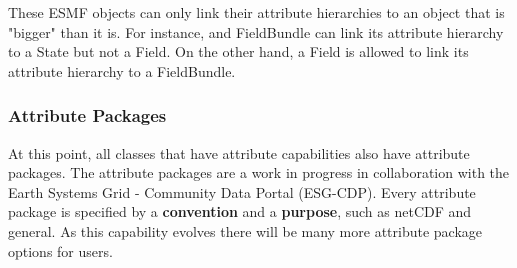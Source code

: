 These ESMF objects can only link their attribute hierarchies to an object that is "bigger" than it is.  For instance, and FieldBundle can link its attribute hierarchy to a State but not a Field.  On the other hand, a Field is allowed to link its attribute hierarchy to a FieldBundle.  

\subsubsection{Attribute Packages}

At this point, all classes that have attribute capabilities also have attribute packages.  The attribute packages are a work in progress in collaboration with the Earth Systems Grid - Community Data Portal (ESG-CDP).  Every attribute package is specified by a {\bf convention} and a {\bf purpose}, such as netCDF and general.  As this capability evolves there will be many more attribute package options for users.  



